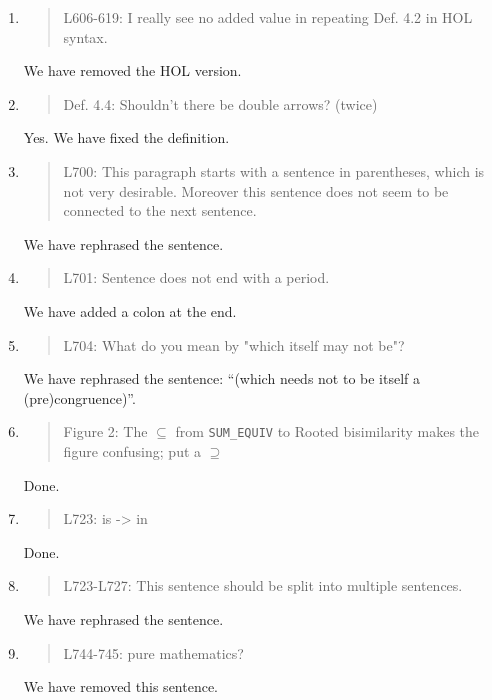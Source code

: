 \begin{enumerate}
\item \begin{quote}
    L606-619: I really see no added value in repeating Def. 4.2 in HOL syntax.
  \end{quote}
  We have removed the HOL version.
  
\item \begin{quote}
    Def. 4.4: Shouldn’t there be double arrows? (twice)
  \end{quote}
  Yes. We have fixed the definition.
  
\item \begin{quote}
    L700: This paragraph starts with a sentence in parentheses, which is not very desirable.
    Moreover this sentence does not seem to be connected to the next sentence.
  \end{quote}
  We have rephrased the sentence.
  
\item \begin{quote}
    L701: Sentence does not end with a period.
  \end{quote}
  We have added a colon at the end.
  
\item \begin{quote}
    L704: What do you mean by "which itself may not be"?
  \end{quote}
  We have rephrased the sentence: ``(which needs not to be itself a (pre)congruence)''.

\item \begin{quote}
    Figure 2: The $\subseteq$ from \texttt{SUM\_EQUIV} to Rooted
    bisimilarity makes the figure confusing; put a $\supseteq$
  \end{quote}
  Done.
  
\item \begin{quote}
    L723: is -> in
  \end{quote}
  Done.
  
\item \begin{quote}
    L723-L727: This sentence should be split into multiple sentences.
  \end{quote}
  We have rephrased the sentence.
  
\item \begin{quote}
    L744-745: pure mathematics?
  \end{quote}
  We have removed this sentence.
  

\end{enumerate}
